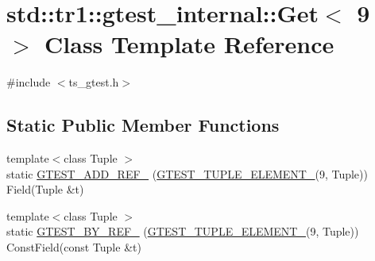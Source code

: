 \hypertarget{classstd_1_1tr1_1_1gtest__internal_1_1Get_3_019_01_4}{\section{std\-:\-:tr1\-:\-:gtest\-\_\-internal\-:\-:Get$<$ 9 $>$ Class Template Reference}
\label{classstd_1_1tr1_1_1gtest__internal_1_1Get_3_019_01_4}
}


{\ttfamily \#include $<$ts\-\_\-gtest.\-h$>$}

\subsection*{Static Public Member Functions}
\begin{DoxyCompactItemize}
\item 
{\footnotesize template$<$class Tuple $>$ }\\static \hyperlink{classstd_1_1tr1_1_1gtest__internal_1_1Get_3_019_01_4_add31197dfdb381d265e221ed62129f45}{G\-T\-E\-S\-T\-\_\-\-A\-D\-D\-\_\-\-R\-E\-F\-\_\-} (\hyperlink{ts__gtest_8h_a1b7f133d8aa02e0b7afed7b66781eeb7}{G\-T\-E\-S\-T\-\_\-\-T\-U\-P\-L\-E\-\_\-\-E\-L\-E\-M\-E\-N\-T\-\_\-}(9, Tuple)) Field(Tuple \&t)
\item 
{\footnotesize template$<$class Tuple $>$ }\\static \hyperlink{classstd_1_1tr1_1_1gtest__internal_1_1Get_3_019_01_4_a5205e8da729e2bee446f5be0c65390af}{G\-T\-E\-S\-T\-\_\-\-B\-Y\-\_\-\-R\-E\-F\-\_\-} (\hyperlink{ts__gtest_8h_a1b7f133d8aa02e0b7afed7b66781eeb7}{G\-T\-E\-S\-T\-\_\-\-T\-U\-P\-L\-E\-\_\-\-E\-L\-E\-M\-E\-N\-T\-\_\-}(9, Tuple)) Const\-Field(const Tuple \&t)
\end{DoxyCompactItemize}


